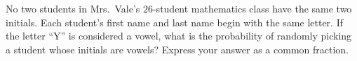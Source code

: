 No two students in Mrs.~Vale's $26$-student mathematics class have the same two initials. Each student's first name and last name begin with the same letter. If the letter ``Y'' is considered a vowel, what is the probability of randomly picking a student whose initials are vowels? Express your answer as a common fraction.
